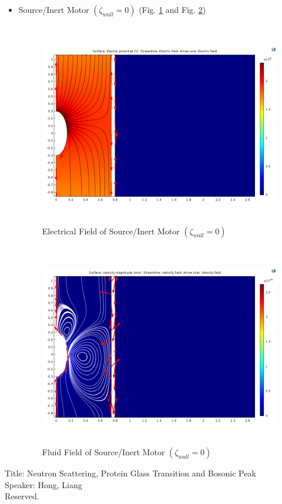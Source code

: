 \documentclass[fontsize=11pt, %
                             paper=a4, %
                             twoside, %
                             captions=tableheading,
                             index=totoc,
                             hyperref]{labbook}
\begin{document}
\begin{addmargin}[4cm]{0cm}
\begin{itemize}
\begin{figure}
\end{figure}
\item Source/Inert Motor $(\zeta_{wall}=0)$ (Fig. \ref{2016-11-13-EFOSIMW0} and Fig. \ref{2016-11-13-FFOSIMW0})
\begin{figure}
\centering
\includegraphics[width=\linewidth, height=3.5in]{2016-11-13-SourceInert-E-Motor.png}
\caption{Electrical Field of Source/Inert Motor $(\zeta_{wall}=0)$}\label{2016-11-13-EFOSIMW0}
\end{figure}
\begin{figure}
\centering
\includegraphics[width=\linewidth, height=3.5in]{2016-11-13-SourceInert-V-Motor.png}
\caption{Fluid Field of Source/Inert Motor $(\zeta_{wall}=0)$}\label{2016-11-13-FFOSIMW0}
\end{figure}
\end{itemize}

Title: Neutron Scattering, Protein Glass Transition and Bosonic Peak\\
Speaker: Hong, Liang\\
Reserved.


\end{addmargin}
\end{document}
